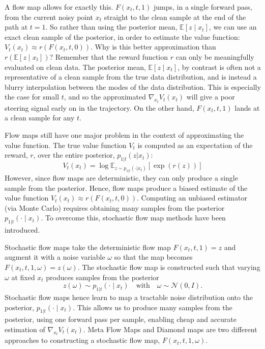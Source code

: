 \documentclass[12pt,a4paper]{report}
\begin{document}
A flow map allows for exactly this. $F(x_t, t, 1)$ jumps, in a single forward pass, from the current noisy point $x_t$ straight to the clean sample at the end of the path at $t=1$. So rather than using the posterior mean, $\mathbb{E}[z \mid x_t]$, we can use an exact clean sample of the posterior, in order to estimate the value function: $V_t(x_t) \approx r(F(x_t, t, 0))$. Why is this better approximation than  $r(\mathbb{E}[z \mid x_t])$? Remember that the reward function $r$ can only be meaningfully evaluated on clean data. The posterior mean, $\mathbb{E}[z \mid x_t]$, by contrast is often not a representative of a clean sample from the true data distribution, and is instead a blurry interpolation between the modes of the data distribution. This is especially the case for small $t$, and so the approximated $\nabla_{x_t}V_t(x_t)$ will give a poor steering signal early on in the trajectory. On the other hand, $F(x_t, t, 1)$ lands at a clean sample for any $t$. 

Flow maps still have one major problem in the context of approximating the value function. The true value function $V_t$ is computed as an expectation of the reward, $r$, over the entire posterior, $p_{1|t}(z|x_t)$:
  \begin{equation}
    V_t(x_t) = \log \mathbb{E}_{z \sim p_{1|t}(\cdot|x_t)}[\exp(r(z))]
\end{equation}
However, since flow maps are deterministic, they can only produce a single sample from the posterior. Hence, flow maps produce a biased estimate of the value function $V_t(x_t) \approx r(F(x_t, t, 0))$. Computing an unbiased estimator (via Monte Carlo) requires obtaining many samples from the posterior $ p_{1|t}(\cdot \mid x_t)$. To overcome this, stochastic flow map methods have been introduced. 

Stochastic flow maps take the deterministic flow map $F(x_t, t, 1)=z$ and augment it with a noise variable $\omega$ so that the map becomes $F(x_t, t, 1, \omega)=z(\omega)$. The stochastic flow map is constructed such that varying $\omega$ at fixed $x_t$ produces samples from the posterior 
$$z(\omega) \sim p_{1|t}(\cdot \mid x_t) \quad \text{with} \quad \omega \sim \mathcal{N}(0, I).$$
Stochastic flow maps hence learn to map a tractable noise distribution onto the posterior, $ p_{1|t}(\cdot \mid x_t)$. This allows us to produce many samples from the posterior, using one forward pass per sample, enabling cheap and accurate estimation of $\nabla_{x_t}V_t(x_t)$. Meta Flow Maps and Diamond maps are two different approaches to constructing a stochastic flow map, $F(x_t, t, 1, \omega)$. 
\end{document}

